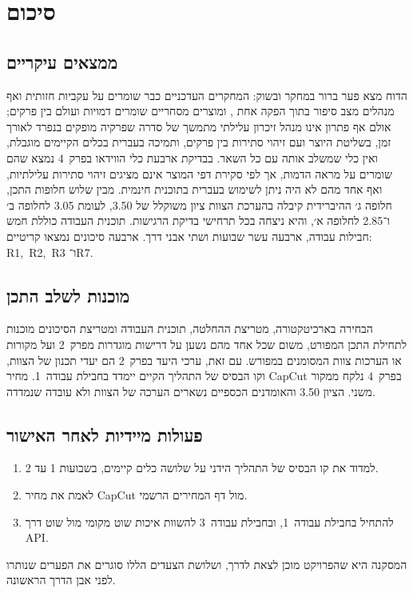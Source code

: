 \chapter{סיכום}

\section{ממצאים עיקריים}
הדוח מצא פער ברור במחקר ובשוק: המחקרים העדכניים כבר שומרים על עקביות חזותית ואף מנהלים מצב סיפור בתוך הפקה אחת \cite{huang2026dramaagent}, ומוצרים מסחריים שומרים דמויות ועולם בין פרקים; אולם אף פתרון אינו מנהל זיכרון עלילתי מתמשך של סדרה שפרקיה מופקים בנפרד לאורך זמן, בשליטת היוצר ועם זיהוי סתירות בין פרקים, ותמיכה בעברית בכלים הקיימים מוגבלת, ואין כלי שמשלב אותה עם כל השאר. בבדיקת ארבעת כלי הווידאו בפרק~4 נמצא שהם שומרים על מראה הדמות, אך לפי סקירת דפי המוצר אינם מציגים זיהוי סתירות עלילתיות, ואף אחד מהם לא היה ניתן לשימוש בעברית בתוכנית חינמית. מבין שלוש חלופות התכן, חלופה ג׳ ההיברידית קיבלה בהערכת הצוות ציון משוקלל של \textenglish{3.50}, לעומת \textenglish{3.05} לחלופה ב׳ ו־\textenglish{2.85} לחלופה א׳, והיא ניצחה בכל תרחישי בדיקת הרגישות. תוכנית העבודה כוללת חמש חבילות עבודה, ארבעה עשר שבועות ושתי אבני דרך. ארבעה סיכונים נמצאו קריטיים: \mbox{\textenglish{R1, R2, R3}} ו־\textenglish{R7}.

\section{מוכנות לשלב התכן}
הבחירה בארכיטקטורה, מטריצת ההחלטה, תוכנית העבודה ומטריצת הסיכונים מוכנות לתחילת התכן המפורט, משום שכל אחד מהם נשען על דרישות מוגדרות מפרק~2 ועל מקורות או הערכות צוות המסומנים במפורש. עם זאת, ערכי היעד בפרק~2 הם יעדי תכנון של הצוות, וקו הבסיס של התהליך הקיים יימדד בחבילת עבודה~1. מחיר \textenglish{CapCut} בפרק~4 נלקח ממקור משני. הציון \textenglish{3.50} והאומדנים הכספיים נשארים הערכה של הצוות ולא עובדה שנמדדה.

\section{פעולות מיידיות לאחר האישור}
\begin{enumerate}
  \item למדוד את קו הבסיס של התהליך הידני על שלושה כלים קיימים, בשבועות 1 עד 2.
  \item לאמת את מחיר \textenglish{CapCut} מול דף המחירים הרשמי.
  \item להתחיל בחבילת עבודה~1, ובחבילת עבודה~3 להשוות איכות שוט מקומי מול שוט דרך \textenglish{API}.
\end{enumerate}

\begin{directornote}
המסקנה היא שהפרויקט מוכן לצאת לדרך, ושלושת הצעדים הללו סוגרים את הפערים שנותרו לפני אבן הדרך הראשונה.
\end{directornote}
